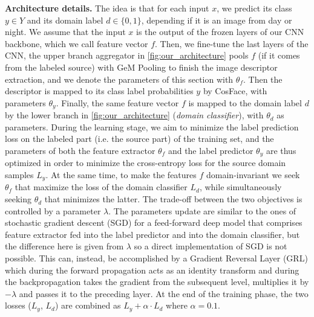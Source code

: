 \documentclass[10pt,twocolumn,letterpaper]{article}
\begin{document}
\textbf{Architecture details.}
The idea is that for each input $x$, we predict its class $y \in Y$ and its domain label $d \in \{0, 1\}$, depending if it is an image from day or night.
We assume that the input $x$ is the output of the frozen layers of our CNN backbone, which we call feature vector $f$.
Then, we fine-tune the last layers of the CNN, the upper branch aggregator in \cref{fig:our_architecture} pools $f$ (if it comes from the labeled source) with GeM Pooling to finish the image descriptor extraction, and we denote the parameters of this section with $\theta_f$. Then the descriptor is mapped to its class label probabilities $y$ by CosFace, with parameters $\theta_y$. Finally, the same feature vector $f$ is mapped to the domain label $d$ by the lower branch in \cref{fig:our_architecture} (\textit{domain classifier}), with $\theta_d$ as parameters.
During the learning stage, we aim to minimize the label
prediction loss on the labeled part (i.e. the source part)
of the training set, and the parameters of both the feature
extractor $\theta_f$ and the label predictor $\theta_y$ are thus optimized in order to minimize the cross-entropy loss for the source domain samples $L_y$. At the same time, to make the features $f$ domain-invariant we seek $\theta_f$ that maximize the loss of the domain classifier $L_d$, while simultaneously seeking $\theta_d$ that minimizes the latter. The trade-off between the two objectives is controlled by a parameter $\lambda$. The parameters update are similar to the ones of stochastic gradient descent (SGD) for a feed-forward deep model that
comprises feature extractor fed into the label predictor and
into the domain classifier, but the difference here is given from $\lambda$ so a direct implementation of SGD is not possible. This can, instead, be accomplished by a Gradient Reversal Layer (GRL)  which during the forward propagation acts as an identity transform and during the backpropagation takes the gradient from
the subsequent level, multiplies it by $-\lambda$ and passes it to
the preceding layer.
At the end of the training phase, the two losses ($L_y$, $L_d$) are combined as $L_y + \alpha \cdot L_d$ where $\alpha = 0.1$.
\end{document}
